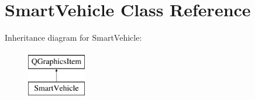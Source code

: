 \hypertarget{class_smart_vehicle}{}\section{Smart\+Vehicle Class Reference}
\label{class_smart_vehicle}
Inheritance diagram for Smart\+Vehicle\+:\begin{figure}[H]
\begin{center}
\leavevmode
\includegraphics[height=2.000000cm]{class_smart_vehicle}
\end{center}
\end{figure}
